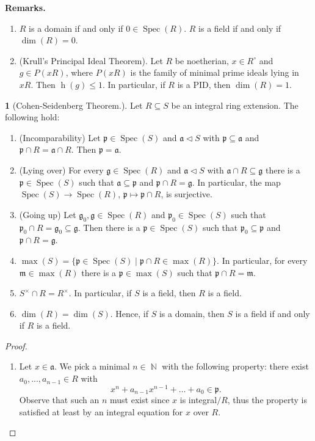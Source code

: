 \documentclass[12pt,a4paper]{report}
\theoremstyle{definition}
\theoremstyle{num.custom-title}
\newtheorem{teo_custom-title}[theorem]{} %
\DeclareMathOperator{\N}{\mathbb{N}}
\DeclareMathOperator{\sse}{\subseteq}
\DeclareMathOperator{\Spec}{Spec}
\DeclareMathOperator{\h}{h}
\newcommand{\g}{\mathfrak{g}}
\newcommand{\p}{\mathfrak{p}}
\newcommand{\m}{\mathfrak{m}}
\begin{document}
\noindent\textbf{Remarks.}
\begin{enumerate}
\item $R$ is a domain if and only if $0 \in \Spec(R)$. $R$ is a field if and only if $\dim(R)=0$.
\item (Krull's Principal Ideal Theorem). Let $R$ be noetherian, $x \in R^\circ$ and $g \in P(xR)$, where $P(xR)$ is the family of minimal prime ideals lying in $xR$. Then $\h(g) \leq 1$. In particular, if $R$ is a PID, then $\dim(R)=1$.
\end{enumerate}

\begin{teo_custom-title}[Cohen-Seidenberg Theorem.]\label{thm_cohen-seid}
Let $R \sse S$ be an integral ring extension. The following hold:
\begin{enumerate}
\item (Incomparability) Let $\p \in \Spec(S)$ and $\mathfrak{a} \lhd S$ with $\p \sse \mathfrak{a}$ and $\p \cap R = \mathfrak{a} \cap R$. Then $\p = \mathfrak{a}$.
\item (Lying over) For every $\g \in \Spec(R)$ and $\mathfrak{a} \lhd S$ with $\mathfrak{a} \cap R \sse \g$ there is a $\p \in \Spec(S)$ such that $\mathfrak{a} \sse \p$ and $\p \cap R = \g$. In particular, the map $\Spec(S) \to \Spec(R)$, $\p \mapsto \p \cap R$, is surjective.
\item (Going up) Let $\g_0, \g \in \Spec(R)$ and $\p_0 \in \Spec(S)$ such that $\p_0 \cap R = \g_0 \sse \g$. Then there is a $\p \in \Spec(S)$ such that $\p_0 \sse \p$ and $\p \cap R = \g$.
\item $\max(S) = \{ \p \in \Spec(S) \mid \p \cap R \in \max(R) \}$. In particular, for every $\m \in \max(R)$ there is a $\p \in \max(S)$ such that $\p \cap R = \m$.
\item $S^\times \cap R = R^\times$. In particular, if $S$ is a field, then $R$ is a field.
\item $\dim(R) = \dim(S)$. Hence, if $S$ is a domain, then $S$ is a field if and only if $R$ is a field.
\end{enumerate}
\begin{proof}\ 
\begin{enumerate}
\item Let $x \in \mathfrak{a}$. We pick a minimal $n \in \N$ with the following property: there exist $a_0,...,a_{n-1} \in R$ with
\[
x^n + a_{n-1}x^{n-1} + \ldots + a_0 \in \p.
\]
Observe that such an $n$ must exist since $x$ is integral$/R$, thus the property is satisfied at least by an integral equation for $x$ over $R$.\\

\end{enumerate}
\end{proof}
\end{teo_custom-title}
\end{document}
